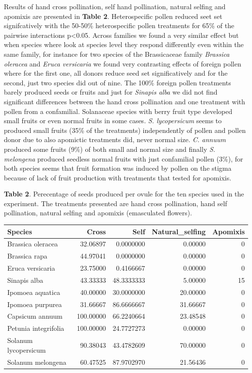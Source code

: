 \documentclass[11pt,a4paper]{article}
\begin{document}
Results of hand cross pollination, self hand pollination, natural
selfing and apomixis are presented in \textbf{Table 2}. Heterospecific
pollen reduced seet set signifcatively with the 50-50\% heterospecific
pollen treatments for 65\% of the pairwise interactions
p\textless{}0.05. Across families we found a very similar effect but
when species where look at species level they respond differently even
within the same family, for instance for two species of the Brassicaceae
family \emph{Brassica oleracea} and \emph{Eruca versicaria} we found
very contrasting effects of foreign pollen where for the first one, all
donors reduce seed set significatively and for the second, just two
species did out of nine. The 100\% foreign pollen treatments barely
produced seeds or fruits and just for \emph{Sinapis alba} we did not
find significant differences between the hand cross pollination and one
treatment with pollen from a confamilial. Solanaceae species with berry
fruit type developed small fruits or even normal fruits in some cases.
\emph{S. lycopersicum} seems to produced small fruits (35\% of the
treatments) independently of pollen and pollen donor due to also
apomictic treatments did, never normal size. \emph{C. annuum} produced
some fruits (9\%) of both small and normal size and finally \emph{S.
melongena} produced seedless normal fruits with just confamilial pollen
(3\%), for both species seems that fruit formation was induced by pollen
on the stigma because of lack of fruit production with treatments that
tested for apomixis.

\textbf{Table 2}. Perecentage of seeds produced per ovule for the ten
species used in the experiment. The treatments presented are hand cross
pollination, hand self pollination, natural selfing and apomixis
(emasculated flowers).

\begin{longtable}[]{@{}lrrrr@{}}
\toprule
Species & Cross & Self & Natural\_selfing & Apomixis\tabularnewline
\midrule
\endhead
Brassica oleracea & 32.06897 & 0.0000000 & 0.00000 & 0\tabularnewline
Brassica rapa & 44.97041 & 0.0000000 & 0.00000 & 0\tabularnewline
Eruca versicaria & 23.75000 & 0.4166667 & 0.00000 & 0\tabularnewline
Sinapis alba & 43.33333 & 48.3333333 & 5.00000 & 15\tabularnewline
Ipomoea aquatica & 40.00000 & 30.0000000 & 20.00000 & 0\tabularnewline
Ipomoea purpurea & 31.66667 & 86.6666667 & 31.66667 & 0\tabularnewline
Capsicum annuum & 100.00000 & 66.2240664 & 23.48548 & 0\tabularnewline
Petunia integrifolia & 100.00000 & 24.7727273 & 0.00000 &
0\tabularnewline
Solanum lycopersicum & 90.38043 & 43.4782609 & 70.00000 &
0\tabularnewline
Solanum melongena & 60.47525 & 87.9702970 & 21.56436 & 0\tabularnewline
\bottomrule
\end{longtable}
\end{document}
